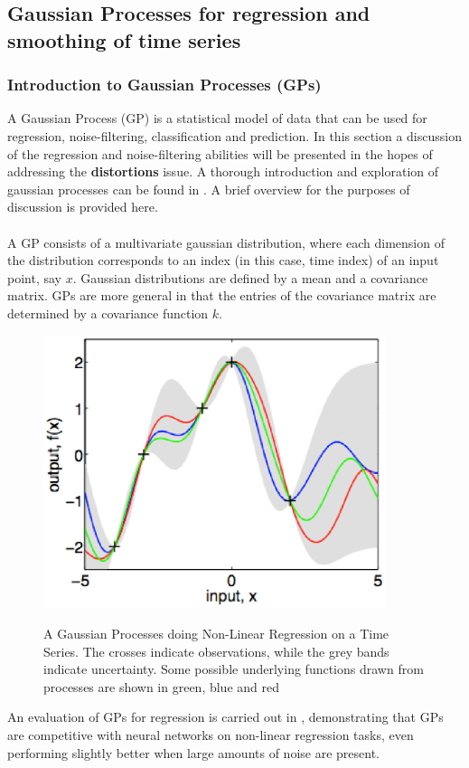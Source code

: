 	\subsection{Gaussian Processes for regression and smoothing of time series}
	\subsubsection{Introduction to Gaussian Processes (GPs)}
	A Gaussian Process (GP) is a statistical model of data that can be used for regression, noise-filtering, classification and prediction. In this section a discussion of the regression and noise-filtering abilities will be presented in the hopes of addressing the \textbf{distortions} issue. A thorough introduction and exploration of gaussian processes can be found in \citep{rasmussen2006gpfml}. A brief overview for the purposes of discussion is provided here.
	
	\paragraph{}
	A GP consists of a multivariate gaussian distribution, where each dimension of the distribution corresponds to an index (in this case, time index) of an input point, say $x$. Gaussian distributions are defined by a mean and a covariance matrix. GPs are more general in that the entries of the covariance matrix are determined by a covariance function $k$. 
	\begin{figure}[ht!]
	\centering
	\includegraphics[width=100mm]{images/gpregression.eps}
	\label{fig:gaussianprocessregression}
	\caption{A Gaussian Processes doing Non-Linear Regression on a Time Series. The crosses indicate observations, while the grey bands indicate uncertainty. Some possible underlying functions drawn from processes are shown in green, blue and red}
	\end{figure}
		An evaluation of GPs for regression is carried out in \citep{rasmussen1996evaluation}, demonstrating that GPs are competitive with neural networks on non-linear regression tasks, even performing slightly better when large amounts of noise are present.
